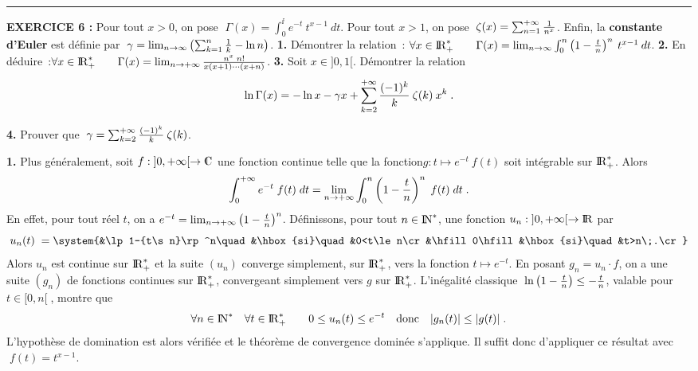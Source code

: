 \documentclass{article}
\begin{document}
\bsk
\hrule
\bsk


{\bf EXERCICE 6 :}\msk
Pour tout $x>0$, on pose $\;\Gamma(x)=\int_0^{\ii}e^{-t}\>t^{x-1}\>dt$.\msk
Pour tout $x>1$, on pose $\;\zeta(x)=\sum_{n=1}^{+\infty}{1\over n^x}$.\msk
Enfin, la {\bf constante d'Euler} est d\'efinie par $\;\gamma=\lim_{n\rightarrow\infty}\left(\sum_{k=1}^n{1\over k}-\ln n\right)$.\msk
{\bf 1.} D\'emontrer la relation~: \qquad $\forall x\in{\rm I\kern-0.6mm R}_+^*\qquad\Gamma(x)=\lim_{n\rightarrow\infty}\int_0^n\left(1-{t\over n}\right)^n\>t^{x-1}\>dt$.\msk
{\bf 2.} En d\'eduire~:\qquad$\forall x\in{\rm I\kern-0.6mm R}_+^*\qquad \Gamma(x)=\lim_{n\rightarrow+\infty}{n^x\;n!\over x(x+1)\cdots(x+n)}$.\msk
{\bf 3.} Soit $x\in]0,1[$. D\'emontrer la relation\vv
$$\ln\Gamma(x)=-\ln x-\gamma x+\sum_{k=2}^{+\infty}{(-1)^k\over k}\>\zeta(k)\>x^k\;.$$\par
{\bf 4.} Prouver que $\;\gamma=\sum_{k=2}^{+\infty}{(-1)^k\over k}\>\zeta(k)$.

\msk
\cl{- - - - - - - - - - - - - - - - - - - - - - - - - - - - - -}
\msk

{\bf 1.} Plus g\'en\'eralement, soit $f:\;]0,\ii[\vers\cmat$ une fonction continue telle que la
fonction\break $g:t\mapsto e^{-t}\>f(t)$ soit int\'egrable sur ${\rm I\kern-0.6mm R}_+^*$. Alors\vv
$$\int_0^{+\infty}e^{-t}\;f(t)\;dt=\lim_{n\rightarrow+\infty}\int_0^n\left(1-{t\over n}\right)
^n\;f(t)\;dt\;.$$
En effet, pour tout r\'eel $t$, on a $e^{-t}=\lim_{n\rightarrow+\infty}
\left(1-{t\over n}\right)^n$. D\'efinissons, pour tout $n\in{\rm I\kern-0.5mm N}^*$, une
fonction $u_n:\;]0,+\infty[\rightarrow{\rm I\kern-0.6mm R}$ par\vv
$$u_n(t)\;=\system{&\lp1-{t\s n}\rp^n\quad&\hbox{si}\quad&0<t\le n\cr
                   &\hfill0\hfill         &\hbox{si}\quad&t>n\;.\cr}$$
Alors $u_n$ est continue sur ${\rm I\kern-0.6mm R}_+^*$ et la suite $(u_n)$ converge
simplement, sur ${\rm I\kern-0.6mm R}_+^*$, vers la fonction $t\mapsto e^{-t}$.\pn
En posant $g_n=u_n\cdot f$, on a une suite $(g_n)$ de fonctions continues
sur ${\rm I\kern-0.6mm R}_+^*$, convergeant simplement vers $g$ sur ${\rm I\kern-0.6mm R}_+^*$.
L'in\'egalit\'e classique $\;\ln\left(1-{t\over n}\right)\le-{t\over n}$, va\-lable pour
$t\in[0,n[\;$, montre que\vv
$$\forall n\in{\rm I\kern-0.5mm N}^*\quad\forall t\in{\rm I\kern-0.6mm R}_+^*\qquad 0\le u_n(t)\le e^{-t}\quad
\hbox{donc}\quad|g_n(t)|\le|g(t)|\;.$$
L'hypoth\`ese de domination est alors v\'erifi\'ee et le th\'eor\`eme de convergence
domin\'ee s'applique. Il suffit donc d'appliquer ce r\'esultat avec $\;f(t)=t^{x-1}$.
\end{document}
